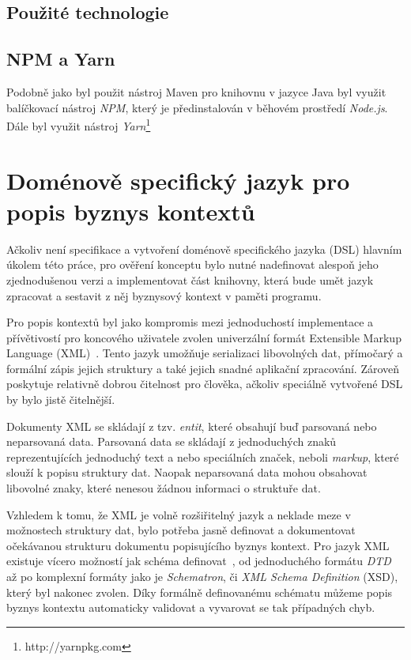 \subsection{Použité technologie}

\subsection{NPM a Yarn}

Podobně jako byl použit nástroj Maven pro knihovnu v jazyce Java byl
využit balíčkovací nástroj \textit{NPM}, který je předinstalován
v běhovém prostředí \textit{Node.js}. Dále byl využit nástroj
\textit{Yarn}\footnote{http://yarnpkg.com} %

\section{Doménově specifický jazyk pro popis byznys kontextů}

Ačkoliv není specifikace a vytvoření doménově specifického jazyka (DSL)
hlavním úkolem této práce, pro ověření konceptu bylo nutné nadefinovat
alespoň jeho zjednodušenou verzi a implementovat část knihovny, která
bude umět jazyk zpracovat a sestavit z něj byznysový kontext v paměti programu.

Pro popis kontextů byl jako kompromis mezi jednoduchostí implementace
a přívětivostí pro koncového uživatele zvolen univerzální formát Extensible
Markup Language (XML)~\cite{bray1997extensible}. Tento
jazyk umožňuje serializaci libovolných dat, přímočarý a formální
zápis jejich struktury a také jejich snadné aplikační zpracování.
Zároveň poskytuje relativně dobrou čitelnost pro člověka, ačkoliv
speciálně vytvořené DSL by bylo jistě čitelnější.

Dokumenty XML se skládají z tzv. \textit{entit}, které obsahují
buď parsovaná nebo neparsovaná data. Parsovaná data se skládají
z jednoduchých znaků reprezentujících jednoduchý text a nebo
speciálních značek, neboli \textit{markup}, které slouží k popisu
struktury dat. Naopak neparsovaná data mohou obsahovat libovolné
znaky, které nenesou žádnou informaci o struktuře dat.

Vzhledem k tomu, že XML je volně rozšiřitelný jazyk a neklade
meze v možnostech struktury dat, bylo potřeba jasně definovat
a dokumentovat očekávanou strukturu dokumentu popisujícího
byznys kontext. Pro jazyk XML existuje vícero možností jak schéma
definovat~\cite{lee2000comparative}, od jednoduchého formátu
\textit{DTD} až po komplexní formáty jako je \textit{Schematron}, či
\textit{XML Schema Definition} (XSD), který byl nakonec zvolen.
Díky formálně definovanému schématu můžeme popis byznys kontextu
automaticky validovat a vyvarovat se tak případných chyb.

